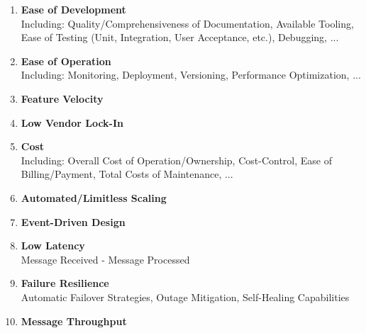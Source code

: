 \begin{enumerate}[nolistsep]\label{lst:surveyItems}
    \item \textbf{Ease of Development}\\
        Including: Quality/Comprehensiveness of Documentation, Available Tooling, Ease of Testing (Unit, Integration, User Acceptance, etc.), Debugging, ...
    \item \textbf{Ease of Operation}\\
        Including: Monitoring, Deployment, Versioning, Performance Optimization, ...
    \item \textbf{Feature Velocity}
    \item \textbf{Low Vendor Lock-In}
    \item \textbf{Cost}\\
        Including: Overall Cost of Operation/Ownership, Cost-Control, Ease of Billing/Payment, Total Costs of Maintenance, ...
    \item \textbf{Automated/Limitless Scaling}
    \item \textbf{Event-Driven Design}
    \item \textbf{Low Latency}\\
         Message Received - Message Processed
    \item \textbf{Failure Resilience}\\
         Automatic Failover Strategies, Outage Mitigation, Self-Healing Capabilities
    \item \textbf{Message Throughput}
\end{enumerate}

